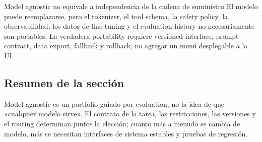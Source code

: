 \begin{warningbox}{Model agnostic no equivale a independencia de la cadena de suministro}
El modelo puede reemplazarse, pero el tokenizer, el tool schema, la safety policy, la observabilidad, los datos de fine-tuning y el evaluation history no necesariamente son portables. La verdadera portability requiere versioned interface, prompt contract, data export, fallback y rollback, no agregar un menú desplegable a la UI.
\end{warningbox}


\subsection{Resumen de la sección}

Model agnostic es un portfolio guiado por evaluation, no la idea de que «cualquier modelo sirve». El contrato de la tarea, las restricciones, las versiones y el routing determinan juntos la elección; cuanto más a menudo se cambia de modelo, más se necesitan interfaces de sistema estables y pruebas de regresión.

